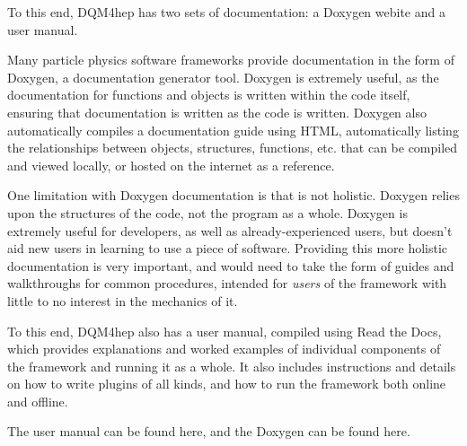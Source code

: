 To this end, DQM4hep has two sets of documentation: a Doxygen webite and a user manual.

Many particle physics software frameworks provide documentation in the form of Doxygen, a documentation generator tool. Doxygen is extremely useful, as the documentation for functions and objects is written within the code itself, ensuring that documentation is written as the code is written. Doxygen also automatically compiles a documentation guide using HTML, automatically listing the relationships between objects, structures, functions, etc. that can be compiled and viewed locally, or hosted on the internet as a reference.

One limitation with Doxygen documentation is that is not holistic. Doxygen relies upon the structures of the code, not the program as a whole. Doxygen is extremely useful for developers, as well as already-experienced users, but doesn't aid new users in learning to use a piece of software. Providing this more holistic documentation is very important, and would need to take the form of guides and walkthroughs for common procedures, intended for \emph{users} of the framework with little to no interest in the mechanics of it.

To this end, DQM4hep also has a user manual, compiled using Read the Docs, which provides explanations and worked examples of individual components of the framework and running it as a whole. It also includes instructions and details on how to write plugins of all kinds, and how to run the framework both online and offline. 

The user manual can be found here\cite{dqm4hep-user-manual}, and the Doxygen can be found here\cite{dqm4hep-doxygen}.